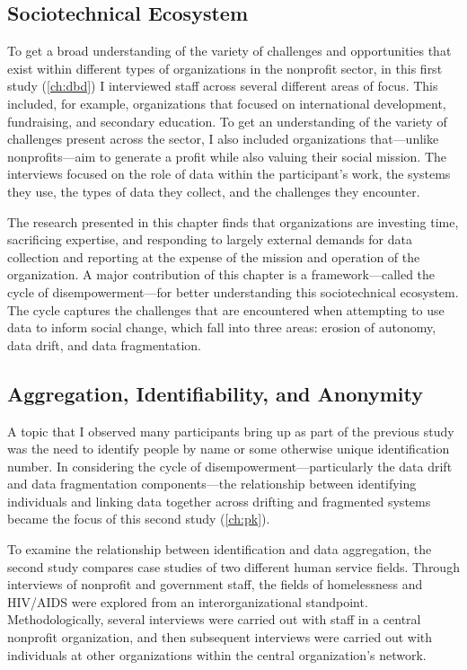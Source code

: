 \subsection{Sociotechnical Ecosystem}
To get a broad understanding of the variety of challenges and opportunities that exist within different types of organizations in the nonprofit sector, in this first study (\autoref{ch:dbd}) I interviewed staff across several different areas of focus. This included, for example, organizations that focused on international development, fundraising, and secondary education. To get an understanding of the variety of challenges present across the sector, I also included organizations that---unlike nonprofits---aim to generate a profit while also valuing their social mission. The interviews focused on the role of data within the participant's work, the systems they use, the types of data they collect, and the challenges they encounter.

The research presented in this chapter finds that organizations are investing time, sacrificing expertise, and responding to largely external demands for data collection and reporting at the expense of the mission and operation of the organization. A major contribution of this chapter is a framework---called the cycle of disempowerment---for better understanding this sociotechnical ecosystem. The cycle captures the challenges that are encountered when attempting to use data to inform social change, which fall into three areas: erosion of autonomy, data drift, and data fragmentation.

\subsection{Aggregation, Identifiability, and Anonymity}
A topic that I observed many participants bring up as part of the previous study was the need to identify people by name or some otherwise unique identification number. In considering the cycle of disempowerment---particularly the data drift and data fragmentation components---the relationship between identifying individuals and linking data together across drifting and fragmented systems became the focus of this second study (\autoref{ch:pk}).

To examine the relationship between identification and data aggregation, the second study compares case studies of two different human service fields. Through interviews of nonprofit and government staff, the fields of homelessness and HIV/AIDS were explored from an interorganizational standpoint. Methodologically, several interviews were carried out with staff in a central nonprofit organization, and then subsequent interviews were carried out with individuals at other organizations within the central organization's network.

